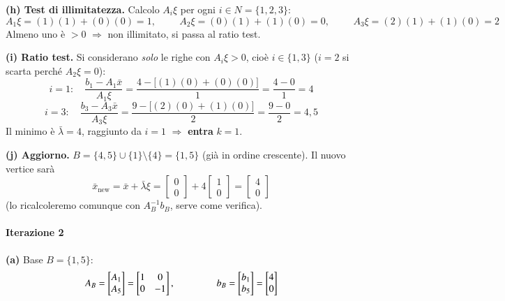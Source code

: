\documentclass[12pt]{extarticle} %
\begin{document}
\textbf{(h) Test di illimitatezza.} Calcolo $A_i\xi$ per ogni $i \in N = \{1,2,3\}$:
\[
A_1\xi = (1)(1) + (0)(0) = 1, \hspace{1cm}
A_2\xi = (0)(1) + (1)(0) = 0, \hspace{1cm}
A_3\xi = (2)(1) + (1)(0) = 2
\]
Almeno uno è $> 0$ $\Rightarrow$ non illimitato, si passa al ratio test.

\textbf{(i) Ratio test.} Si considerano \emph{solo} le righe con $A_i\xi > 0$, cioè $i \in \{1,3\}$ ($i=2$ si scarta perché $A_2\xi = 0$):
\[
i = 1: \quad \frac{b_1 - A_1\bar{x}}{A_1\xi} = \frac{4 - \big[(1)(0)+(0)(0)\big]}{1} = \frac{4 - 0}{1} = 4
\]
\[
i = 3: \quad \frac{b_3 - A_3\bar{x}}{A_3\xi} = \frac{9 - \big[(2)(0)+(1)(0)\big]}{2} = \frac{9 - 0}{2} = 4{,}5
\]
Il minimo è $\bar{\lambda} = 4$, raggiunto da $i = 1$ $\Rightarrow$ \textbf{entra} $k = 1$.

\textbf{(j) Aggiorno.} $B = \{4,5\} \cup \{1\} \setminus \{4\} = \{1,5\}$ (già in ordine crescente). Il nuovo vertice sarà
\[
\bar{x}_{\text{new}} = \bar{x} + \bar{\lambda}\xi = \begin{bmatrix} 0\\0\end{bmatrix} + 4\begin{bmatrix} 1\\0\end{bmatrix} = \begin{bmatrix} 4\\0\end{bmatrix}
\]
(lo ricalcoleremo comunque con $A_B^{-1}b_B$, serve come verifica).

\bigskip
\paragraph{Iterazione 2}

\textbf{(a)} Base $B = \{1,5\}$:
\[
A_B = \begin{bmatrix} A_1 \\ A_5 \end{bmatrix} = \begin{bmatrix} 1 & 0\\ 0 & -1\end{bmatrix},
\hspace{1.5cm}
b_B = \begin{bmatrix} b_1 \\ b_5\end{bmatrix} = \begin{bmatrix} 4\\ 0\end{bmatrix}
\]
\end{document}
